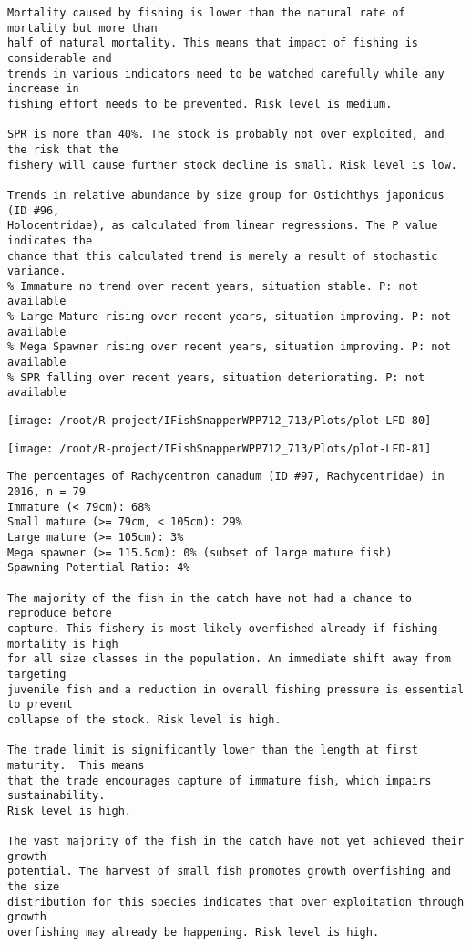 \documentclass{report}\usepackage[]{graphicx}\usepackage[]{color}
\makeatletter
\def\maxwidth{ %
  \ifdim\Gin@nat@width>\linewidth
    \linewidth
  \else
    \Gin@nat@width
  \fi
}
\newenvironment{kframe}{%
 \def\at@end@of@kframe{}%
 \ifinner\ifhmode%
  \def\at@end@of@kframe{\end{minipage}}%
  \begin{minipage}{\columnwidth}%
 \fi\fi%
 \def\FrameCommand##1{\hskip\@totalleftmargin \hskip-\fboxsep
 \colorbox{shadecolor}{##1}\hskip-\fboxsep
     \hskip-\linewidth \hskip-\@totalleftmargin \hskip\columnwidth}%
 \MakeFramed {\advance\hsize-\width
   \@totalleftmargin\z@ \linewidth\hsize
   \@setminipage}}%
 {\par\unskip\endMakeFramed%
 \at@end@of@kframe}
\newenvironment{knitrout}{}{} %
\makeatother
\begin{document}
\begin{knitrout}
\begin{kframe}
\begin{verbatim}
Mortality caused by fishing is lower than the natural rate of mortality but more than
half of natural mortality. This means that impact of fishing is considerable and
trends in various indicators need to be watched carefully while any increase in
fishing effort needs to be prevented. Risk level is medium.
 
SPR is more than 40%. The stock is probably not over exploited, and the risk that the
fishery will cause further stock decline is small. Risk level is low.
 
Trends in relative abundance by size group for Ostichthys japonicus (ID #96,
Holocentridae), as calculated from linear regressions. The P value indicates the
chance that this calculated trend is merely a result of stochastic variance.
% Immature no trend over recent years, situation stable. P: not available
% Large Mature rising over recent years, situation improving. P: not available
% Mega Spawner rising over recent years, situation improving. P: not available
% SPR falling over recent years, situation deteriorating. P: not available
\end{verbatim}
\end{kframe}
\texttt{[image: /root/R-project/IFishSnapperWPP712\_713/Plots/plot-LFD-80]} 

\texttt{[image: /root/R-project/IFishSnapperWPP712\_713/Plots/plot-LFD-81]} 
\begin{kframe}\begin{verbatim}
The percentages of Rachycentron canadum (ID #97, Rachycentridae) in 2016, n = 79
Immature (< 79cm): 68%
Small mature (>= 79cm, < 105cm): 29%
Large mature (>= 105cm): 3%
Mega spawner (>= 115.5cm): 0% (subset of large mature fish)
Spawning Potential Ratio: 4%
 
The majority of the fish in the catch have not had a chance to reproduce before
capture. This fishery is most likely overfished already if fishing mortality is high
for all size classes in the population. An immediate shift away from targeting
juvenile fish and a reduction in overall fishing pressure is essential to prevent
collapse of the stock. Risk level is high.

The trade limit is significantly lower than the length at first maturity.  This means
that the trade encourages capture of immature fish, which impairs sustainability.
Risk level is high.

The vast majority of the fish in the catch have not yet achieved their growth
potential. The harvest of small fish promotes growth overfishing and the size
distribution for this species indicates that over exploitation through growth
overfishing may already be happening. Risk level is high.


\end{verbatim}
\end{kframe}
\end{knitrout}
\end{document}
